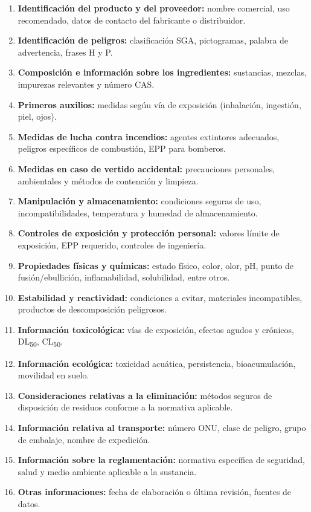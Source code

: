 \begin{enumerate}
    \item \textbf{Identificación del producto y del proveedor:} nombre comercial, uso recomendado, datos de contacto del fabricante o distribuidor.
    \item \textbf{Identificación de peligros:} clasificación SGA, pictogramas, palabra de advertencia, frases H y P.
    \item \textbf{Composición e información sobre los ingredientes:} sustancias, mezclas, impurezas relevantes y número CAS.
    \item \textbf{Primeros auxilios:} medidas según vía de exposición (inhalación, ingestión, piel, ojos).
    \item \textbf{Medidas de lucha contra incendios:} agentes extintores adecuados, peligros específicos de combustión, EPP para bomberos.
    \item \textbf{Medidas en caso de vertido accidental:} precauciones personales, ambientales y métodos de contención y limpieza.
    \item \textbf{Manipulación y almacenamiento:} condiciones seguras de uso, incompatibilidades, temperatura y humedad de almacenamiento.
    \item \textbf{Controles de exposición y protección personal:} valores límite de exposición, EPP requerido, controles de ingeniería.
    \item \textbf{Propiedades físicas y químicas:} estado físico, color, olor, pH, punto de fusión/ebullición, inflamabilidad, solubilidad, entre otros.
    \item \textbf{Estabilidad y reactividad:} condiciones a evitar, materiales incompatibles, productos de descomposición peligrosos.
    \item \textbf{Información toxicológica:} vías de exposición, efectos agudos y crónicos, DL\textsubscript{50}, CL\textsubscript{50}.
    \item \textbf{Información ecológica:} toxicidad acuática, persistencia, bioacumulación, movilidad en suelo.
    \item \textbf{Consideraciones relativas a la eliminación:} métodos seguros de disposición de residuos conforme a la normativa aplicable.
    \item \textbf{Información relativa al transporte:} número ONU, clase de peligro, grupo de embalaje, nombre de expedición.
    \item \textbf{Información sobre la reglamentación:} normativa específica de seguridad, salud y medio ambiente aplicable a la sustancia.
    \item \textbf{Otras informaciones:} fecha de elaboración o última revisión, fuentes de datos.
\end{enumerate}

